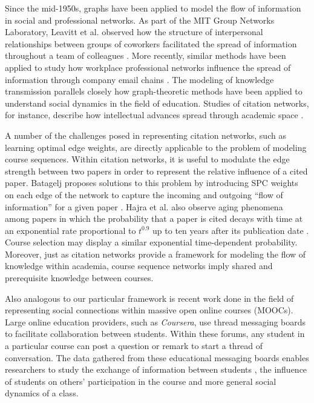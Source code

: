 Since the mid-1950s, graphs have been applied to model the flow of information in social and professional networks. As part of the MIT Group Networks Laboratory, Leavitt et al. observed how the structure of interpersonal relationships between groups of coworkers facilitated the spread of information throughout a team of colleagues \cite{Leavitt1951}. More recently, similar methods have been applied to study how workplace professional networks influence the spread of information through company email chains \cite{Fisher2004}. The modeling of knowledge transmission parallels closely how graph-theoretic methods have been applied to understand social dynamics in the field of education. Studies of citation networks, for instance, describe how intellectual advances spread through academic space \cite{Batagelj2003, Garfield1964}. 



A number of the challenges posed in representing citation networks, such as learning optimal edge weights, are directly applicable to the problem of modeling course sequences. Within citation networks, it is useful to modulate the edge strength between two papers in order to represent the relative influence of a cited paper. Batagelj proposes solutions to this problem by introducing SPC weights on each edge of the network to capture the incoming and outgoing ``flow of information'' for a given paper \cite{Batagelj2003}. Hajra et al. also observe aging phenomena among papers in which the probability that a paper is cited decays with time at an exponential rate proportional to $t^{0.9}$ up to ten years after its publication date \cite{Hajra2005}. Course selection may display a similar exponential time-dependent probability. Moreover, just as citation networks provide a framework for modeling the flow of knowledge within academia, course sequence networks imply shared and prerequisite knowledge between courses. 

Also analogous to our particular framework is recent work done in the field of representing social connections within massive open online courses (MOOCs). Large online education providers, such as \textit{Coursera}, use thread messaging boards to facilitate collaboration between students. Within these forums, any student in a particular course can post a question or remark to start a thread of conversation. The data gathered from these educational messaging boards enables researchers to study the exchange of information between students \cite{Brinton2016}, the influence of students on others' participation in the course \cite{Sinha2014a} and more general social dynamics of a class.

